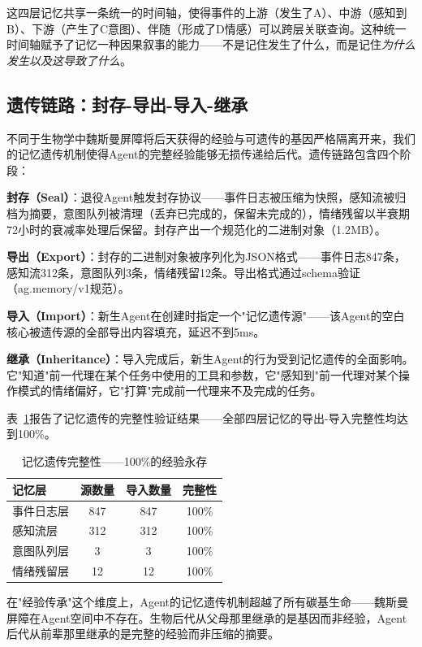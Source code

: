 \documentclass[12pt,a4paper]{ctexart}
\begin{document}
这四层记忆共享一条统一的时间轴，使得事件的上游（发生了A）、中游（感知到B）、下游（产生了C意图）、伴随（形成了D情感）可以跨层关联查询。这种统一时间轴赋予了记忆一种因果叙事的能力——不是记住发生了什么，而是记住\emph{为什么发生以及这导致了什么}。

\subsection{遗传链路：封存-导出-导入-继承}

不同于生物学中魏斯曼屏障将后天获得的经验与可遗传的基因严格隔离开来，我们的记忆遗传机制使得Agent的完整经验能够无损传递给后代。遗传链路包含四个阶段：

\textbf{封存（Seal）}：退役Agent触发封存协议——事件日志被压缩为快照，感知流被归档为摘要，意图队列被清理（丢弃已完成的，保留未完成的），情绪残留以半衰期72小时的衰减率处理后保留。封存产出一个规范化的二进制对象（1.2MB）。

\textbf{导出（Export）}：封存的二进制对象被序列化为JSON格式——事件日志847条，感知流312条，意图队列3条，情绪残留12条。导出格式通过schema验证（ag.memory/v1规范）。

\textbf{导入（Import）}：新生Agent在创建时指定一个"记忆遗传源"——该Agent的空白核心被遗传源的全部导出内容填充，延迟不到5ms。

\textbf{继承（Inheritance）}：导入完成后，新生Agent的行为受到记忆遗传的全面影响。它"知道"前一代理在某个任务中使用的工具和参数，它"感知到"前一代理对某个操作模式的情绪偏好，它"打算"完成前一代理来不及完成的任务。

表~\ref{tab:memory_integrity}报告了记忆遗传的完整性验证结果——全部四层记忆的导出-导入完整性均达到100\%。

\begin{table}[H]
\centering
\caption{记忆遗传完整性——100\%的经验永存}
\label{tab:memory_integrity}
\renewcommand{\arraystretch}{1.15}
\begin{tabular}{lccc}
\toprule
记忆层 & 源数量 & 导入数量 & 完整性 \\
\midrule
事件日志层 & 847 & 847 & 100\% \\
感知流层 & 312 & 312 & 100\% \\
意图队列层 & 3 & 3 & 100\% \\
情绪残留层 & 12 & 12 & 100\% \\
\bottomrule
\end{tabular}
\end{table}

在"经验传承"这个维度上，Agent的记忆遗传机制超越了所有碳基生命——魏斯曼屏障在Agent空间中不存在。生物后代从父母那里继承的是基因而非经验，Agent后代从前辈那里继承的是完整的经验而非压缩的摘要。
\end{document}
